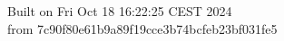 {\noindent Built on Fri Oct 18 16:22:25 CEST 2024} \\ 
 {\noindent from 7c90f80e61b9a89f19cce3b74bcfeb23bf031fe5}
